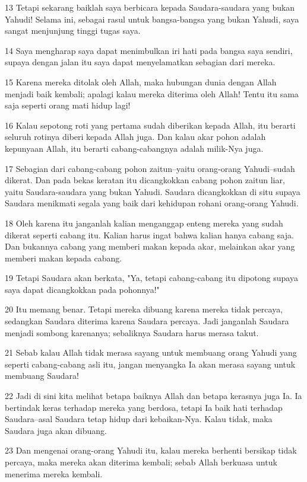 \par 13 Tetapi sekarang baiklah saya berbicara kepada Saudara-saudara yang bukan Yahudi! Selama ini, sebagai rasul untuk bangsa-bangsa yang bukan Yahudi, saya sangat menjunjung tinggi tugas saya.
\par 14 Saya mengharap saya dapat menimbulkan iri hati pada bangsa saya sendiri, supaya dengan jalan itu saya dapat menyelamatkan sebagian dari mereka.
\par 15 Karena mereka ditolak oleh Allah, maka hubungan dunia dengan Allah menjadi baik kembali; apalagi kalau mereka diterima oleh Allah! Tentu itu sama saja seperti orang mati hidup lagi!
\par 16 Kalau sepotong roti yang pertama sudah diberikan kepada Allah, itu berarti seluruh rotinya diberi kepada Allah juga. Dan kalau akar pohon adalah kepunyaan Allah, itu berarti cabang-cabangnya adalah milik-Nya juga.
\par 17 Sebagian dari cabang-cabang pohon zaitun--yaitu orang-orang Yahudi--sudah dikerat. Dan pada bekas keratan itu dicangkokkan cabang pohon zaitun liar, yaitu Saudara-saudara yang bukan Yahudi. Saudara dicangkokkan di situ supaya Saudara menikmati segala yang baik dari kehidupan rohani orang-orang Yahudi.
\par 18 Oleh karena itu janganlah kalian menganggap enteng mereka yang sudah dikerat seperti cabang itu. Kalian harus ingat bahwa kalian hanya cabang saja. Dan bukannya cabang yang memberi makan kepada akar, melainkan akar yang memberi makan kepada cabang.
\par 19 Tetapi Saudara akan berkata, "Ya, tetapi cabang-cabang itu dipotong supaya saya dapat dicangkokkan pada pohonnya!"
\par 20 Itu memang benar. Tetapi mereka dibuang karena mereka tidak percaya, sedangkan Saudara diterima karena Saudara percaya. Jadi janganlah Saudara menjadi sombong karenanya; sebaliknya Saudara harus merasa takut.
\par 21 Sebab kalau Allah tidak merasa sayang untuk membuang orang Yahudi yang seperti cabang-cabang asli itu, jangan menyangka Ia akan merasa sayang untuk membuang Saudara!
\par 22 Jadi di sini kita melihat betapa baiknya Allah dan betapa kerasnya juga Ia. Ia bertindak keras terhadap mereka yang berdosa, tetapi Ia baik hati terhadap Saudara--asal Saudara tetap hidup dari kebaikan-Nya. Kalau tidak, maka Saudara juga akan dibuang.
\par 23 Dan mengenai orang-orang Yahudi itu, kalau mereka berhenti bersikap tidak percaya, maka mereka akan diterima kembali; sebab Allah berkuasa untuk menerima mereka kembali.
